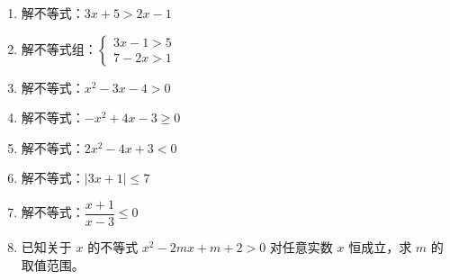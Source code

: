 \documentclass[12pt, a4paper]{ctexart}
\begin{document}
\begin{enumerate}
  \item 解不等式：$3x + 5 > 2x - 1$

  \item 解不等式组：$\begin{cases} 3x - 1 > 5 \\ 7 - 2x > 1 \end{cases}$

  \item 解不等式：$x^2 - 3x - 4 > 0$

  \item 解不等式：$-x^2 + 4x - 3 \geq 0$

  \item 解不等式：$2x^2 - 4x + 3 < 0$

  \item 解不等式：$|3x + 1| \leq 7$

  \item 解不等式：$\dfrac{x + 1}{x - 3} \leq 0$

  \item 已知关于 $x$ 的不等式 $x^2 - 2mx + m + 2 > 0$ 对任意实数 $x$ 恒成立，求 $m$ 的取值范围。
\end{enumerate}
\end{document}

